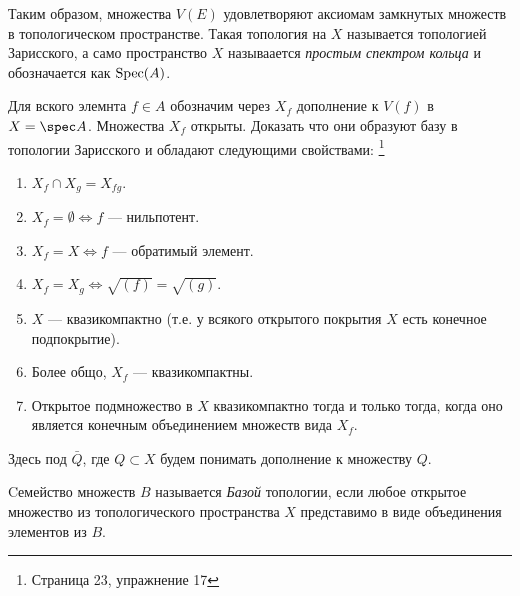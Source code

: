     Таким образом, множества $V(E)$ удовлетворяют аксиомам замкнутых множеств в топологическом пространстве. Такая топология на $X$ называется топологией Зарисского,
    а само пространство $X$ называается \textit{простым спектром кольца} и обозначается как $\textup{Spec}(A)$.

    \begin{Ex}
        Для вского элемнта $f \in A$ обозначим через $X_f$ дополнение к $V(f)$ в $X = \spec A$. Множества $X_f$ открыты. Доказать что они образуют базу в топологии Зарисского и обладают
        следующими свойствами: \footnote{\cite{A-M} Страница 23, упражнение 17}
        \begin{enumerate}
            \item $X_f \cap X_g = X_{fg}$.
            \item $X_f = \emptyset \Leftrightarrow f$ --- нильпотент.
            \item $X_f = X \Leftrightarrow f$ --- обратимый элемент.
            \item $X_f = X_g \Leftrightarrow \sqrt{(f)} = \sqrt{(g)}$.
            \item $X$ --- квазикомпактно (т.е. у всякого открытого покрытия $X$ есть конечное подпокрытие).
            \item Более общо, $X_f$ --- квазикомпактны.
            \item Открытое подмножество в $X$ квазикомпактно тогда и только тогда, когда оно является конечным объединением множеств вида $X_f$.
        \end{enumerate}
    \end{Ex}
    Здесь под $\bar Q$, где $Q \subset X$ будем понимать дополнение к множеству $Q$.

    \begin{Def}
        Cемейство множеств $B$ называется \textit{Базой} топологии, если любое открытое множество из топологического пространства $X$ представимо в виде объединения элементов из $B$.
    \end{Def}

